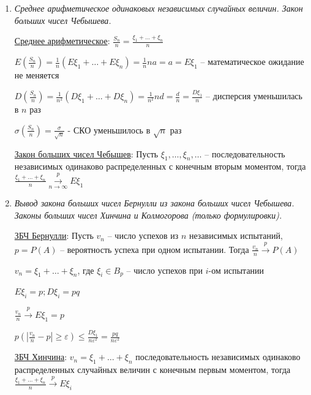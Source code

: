 \begin{enumerate}
    \item \textit{Среднее арифметическое одинаковых независимых случайных величин. Закон больших чисел Чебышева.}

    \hyperlink{averagevalueofrandomvariables}{Среднее арифметическое}: $\frac{S_n}{n} = \frac{\xi_1 + \dots + \xi_n}{n}$

    $E\left(\frac{S_n}{n}\right) = \frac{1}{n} (E\xi_1 + \dots + E\xi_n) = \frac{1}{n} na = a = E\xi_1$ -- математическое ожидание не меняется

    $D\left(\frac{S_n}{n}\right) = \frac{1}{n^2} (D\xi_1 + \dots + D\xi_n) = \frac{1}{n^2} nd = \frac{d}{n} = \frac{D\xi_1}{n}$ -- дисперсия уменьшилась в $n$ раз

    $\sigma\left(\frac{S_n}{n}\right) = \frac{\sigma}{\sqrt{n}}$ - СКО уменьшилось в $\sqrt{n}$ раз

    \hyperlink{lawofbignumberschebyshev}{Закон больших чисел Чебышев}: \Ths Пусть $\xi_1, \dots, \xi_n, \dots$ -- последовательность независимых одинаково распределенных с конечным вторым моментом,
    тогда $\frac{\xi_1 + \dots + \xi_n}{n} \overset{p}{\underset{n \to \infty}{\longrightarrow}} E\xi_1$

    \item \textit{Вывод закона больших чисел Бернулли из закона больших чисел Чебышева. Законы больших чисел Хинчина и Колмогорова (только формулировки).}

    \hyperlink{lawofbignumbersbernoulli2}{ЗБЧ Бернулли}: \Ths Пусть $v_n$ -- число успехов из $n$ независимых испытаний, $p = P(A)$ -- вероятность успеха при одном испытании.
    Тогда $\frac{v_n}{n} \overset{p}{\longrightarrow} P(A)$

    \begin{MyProof}
        $v_n = \xi_1 + \dots + \xi_n$, где $\xi_i \in B_p$ -- число успехов при $i$-ом испытании

        $E\xi_i = p; D\xi_i = pq$

        $\frac{v_n}{n} \overset{p}{\longrightarrow} E\xi_1 = p$

        $p\left(\left|\frac{v_n}{n} - p\right| \geq \varepsilon\right) \leq \frac{D\xi_1}{n\varepsilon^2} = \frac{pq}{n\varepsilon^2}$
    \end{MyProof}

    \hyperlink{lawofbignumberskhinchin}{ЗБЧ Хинчина}: \Ths $v_n = \xi_1 + \dots + \xi_n$ последовательность независимых одинаково распределенных случайных величин с конечным первым моментом, тогда
    $\frac{\xi_1 + \dots + \xi_n}{n} \overset{p}{\longrightarrow} E\xi_i$


\end{enumerate}
